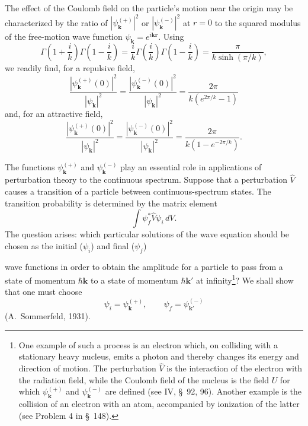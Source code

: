 The effect of the Coulomb field on the particle's motion near the origin may
be characterized by the ratio of $|\psi_{\mathbf k}^{(+)}|^2$ or
$|\psi_{\mathbf k}^{(-)}|^2$ at $r=0$ to the squared modulus of the
free-motion wave function $\psi_{\mathbf k}=e^{i\mathbf{kr}}$. Using
\[
 \Gamma\left(1+\frac{i}{k}\right)\Gamma\left(1-\frac{i}{k}\right)
 =\frac{i}{k}\Gamma\left(\frac{i}{k}\right)\Gamma\left(1-\frac{i}{k}\right)
 =\frac{\pi}{k\sinh(\pi/k)},
\]
we readily find, for a repulsive field,
\begin{equation}
 \frac{|\psi_{\mathbf k}^{(+)}(0)|^2}{|\psi_{\mathbf k}|^2}
 =\frac{|\psi_{\mathbf k}^{(-)}(0)|^2}{|\psi_{\mathbf k}|^2}
 =\frac{2\pi}{k(e^{2\pi/k}-1)}
 \tag{136.10}
\end{equation}
and, for an attractive field,
\begin{equation}
 \frac{|\psi_{\mathbf k}^{(+)}(0)|^2}{|\psi_{\mathbf k}|^2}
 =\frac{|\psi_{\mathbf k}^{(-)}(0)|^2}{|\psi_{\mathbf k}|^2}
 =\frac{2\pi}{k(1-e^{-2\pi/k})}.
 \tag{136.11}
\end{equation}

The functions $\psi_{\mathbf k}^{(+)}$ and $\psi_{\mathbf k}^{(-)}$ play an
essential role in applications of perturbation theory to the continuous
spectrum. Suppose that a perturbation $\hat V$ causes a transition of a
particle between continuous-spectrum states. The transition probability is
determined by the matrix element
\begin{equation}
 \int\psi_f^*\hat V\psi_i\,dV.
 \tag{136.12}
\end{equation}
The question arises: which particular solutions of the wave equation should
be chosen as the initial ($\psi_i$) and final ($\psi_f$)

wave functions in order to obtain the amplitude for a particle to pass from a
state of momentum $\hbar\mathbf k$ to a state of momentum
$\hbar\mathbf k'$ at infinity\footnote{One example of such a process is an
electron which, on colliding with a stationary heavy nucleus, emits a photon
and thereby changes its energy and direction of motion. The perturbation
$\hat V$ is the interaction of the electron with the radiation field, while
the Coulomb field of the nucleus is the field $U$ for which
$\psi_{\mathbf k}^{(+)}$ and $\psi_{\mathbf k}^{(-)}$ are defined (see IV,
\S~92, 96). Another example is the collision of an electron with an atom,
accompanied by ionization of the latter (see Problem 4 in \S~148).}? We shall
show that one must choose
\begin{equation}
 \psi_i=\psi_{\mathbf k}^{(+)},\qquad\psi_f=\psi_{\mathbf k'}^{(-)}
 \tag{136.13}
\end{equation}
(A.~Sommerfeld, 1931).

